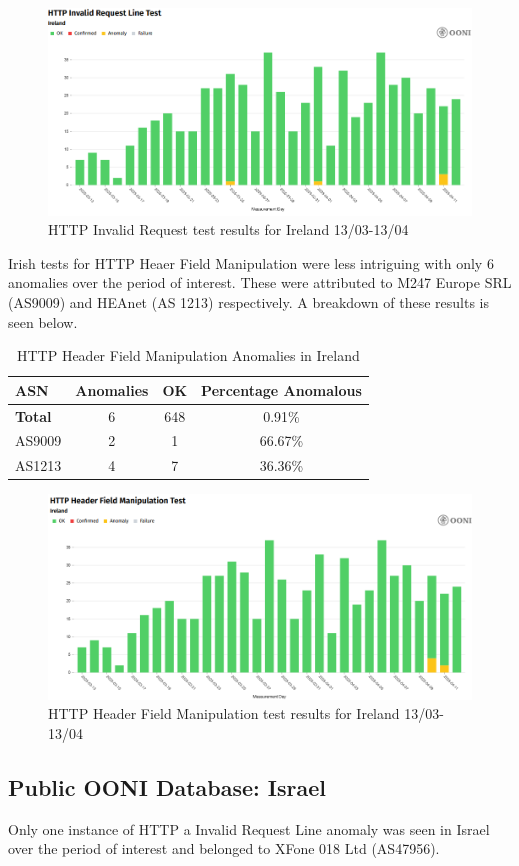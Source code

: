 \begin{figure} [H]
    \centering
    \includegraphics[width=0.5\linewidth]{IREOONIDBMB1.png}
    \caption{HTTP Invalid Request test results for Ireland 13/03-13/04}
    \label{fig:enter-label}
\end{figure}

Irish tests for HTTP Heaer Field Manipulation were less intriguing with only 6 anomalies over the period of interest. These were attributed to M247 Europe SRL (AS9009) and HEAnet (AS 1213) respectively. A breakdown of these results is seen below.


\begin{table}[H]
\centering
\caption{HTTP Header Field Manipulation Anomalies in Ireland}
\begin{tabular}{lccc}
\toprule
\textbf{ASN} & \textbf{Anomalies} & \textbf{OK} & \textbf{Percentage Anomalous} \\
\midrule
\textbf{Total}   & 6 & 648 & 0.91\% \\
\midrule
AS9009           & 2 & 1   & 66.67\% \\
AS1213           & 4 & 7   & 36.36\% \\
\bottomrule
\end{tabular}
\label{tab:http_header_ireland}
\end{table}

\begin{figure} [H]
    \centering
    \includegraphics[width=0.5\linewidth]{IREOONIDBMB2.png}
    \caption{HTTP Header Field Manipulation test results for Ireland 13/03-13/04}
    \label{fig:enter-label}
\end{figure}







\subsection{Public OONI Database: Israel}
Only one instance of HTTP a Invalid Request Line anomaly was seen in Israel over the period of interest and belonged to XFone 018 Ltd (AS47956). 


